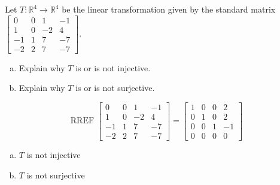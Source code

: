 
\begin{exerciseStatement}
 Let \(T:\mathbb{R}^ 4  \to \mathbb{R}^ 4 \) be the linear transformation given by the standard matrix \( \left[\begin{array}{cccc}
0 & 0 & 1 & -1 \\
1 & 0 & -2 & 4 \\
-1 & 1 & 7 & -7 \\
-2 & 2 & 7 & -7
\end{array}\right] .\)
\begin{enumerate}[(a)]
\item Explain why \(T\) is or is not injective.
\item Explain why \(T\) is or is not surjective.
\end{enumerate}
    
\end{exerciseStatement}
    
\begin{exerciseAnswer} 


\[\operatorname{RREF} \left[\begin{array}{cccc}
0 & 0 & 1 & -1 \\
1 & 0 & -2 & 4 \\
-1 & 1 & 7 & -7 \\
-2 & 2 & 7 & -7
\end{array}\right] = \left[\begin{array}{cccc}
1 & 0 & 0 & 2 \\
0 & 1 & 0 & 2 \\
0 & 0 & 1 & -1 \\
0 & 0 & 0 & 0
\end{array}\right] \]


\begin{enumerate}[(a)]
\item \(T\) is not injective
\item \(T\) is not surjective
\end{enumerate}
    
\end{exerciseAnswer}
    
